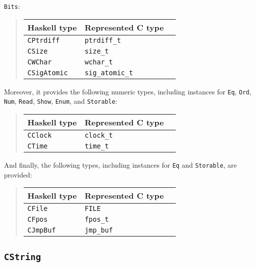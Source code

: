 \documentclass[a4paper,twoside]{article}
\newcommand{\code}[1]{\texttt{#1}}      %
\begin{document}
\code{Bits}:
%
\begin{quote}
  \begin{tabular}{|l|l|l|}
    \hline
    Haskell type     & Represented C type\\\hline\hline
    \code{CPtrdiff}  & \code{ptrdiff\_t}\\\hline
    \code{CSize}     & \code{size\_t}\\\hline
    \code{CWChar}    & \code{wchar\_t}\\\hline
    \code{CSigAtomic}& \code{sig\_atomic\_t}\\\hline
  \end{tabular}
\end{quote}
%
Moreover, it provides the following numeric types, including instances for
\code{Eq}, \code{Ord}, \code{Num}, \code{Read}, \code{Show}, \code{Enum}, and
\code{Storable}:
%
\begin{quote}
  \begin{tabular}{|l|l|l|}
    \hline
    Haskell type     & Represented C type\\\hline\hline
    \code{CClock}    & \code{clock\_t}\\\hline
    \code{CTime}     & \code{time\_t}\\\hline
  \end{tabular}
\end{quote}
%
And finally, the following types, including instances for \code{Eq} and
\code{Storable}, are provided:
%
\begin{quote}
  \begin{tabular}{|l|l|l|}
    \hline
    Haskell type     & Represented C type\\\hline\hline
    \code{CFile}     & \code{FILE}\\\hline
    \code{CFpos}     & \code{fpos\_t}\\\hline
    \code{CJmpBuf}   & \code{jmp\_buf}\\\hline
  \end{tabular}
\end{quote}

\subsection{\code{CString}}
\label{sec:CString}
\end{document}

